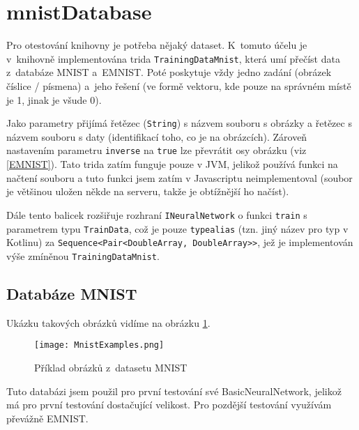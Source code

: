 \documentclass[12pt]{report}			%
\newcommand{\glsref}[1]{\glsdisp{#1}{\phantom{}}}
\begin{document}
			\section{mnistDatabase}
				Pro otestování knihovny je potřeba nějaký dataset. K~tomuto účelu je v~knihovně implementována \gls{trida} \verb!TrainingDataMnist!, která umí přečíst data z~databáze MNIST a~EMNIST. Poté poskytuje vždy jedno zadání (obrázek číslice / písmena) a~jeho řešení (ve formě vektoru, kde pouze na správném místě je 1, jinak je všude 0).
				
				Jako parametry přijímá řetězec (\verb!String!) s názvem souboru s obrázky a řetězec s názvem souboru s daty (identifikací toho, co je na obrázcích). Zároveň nastavením parametru \verb!inverse! na \glsref{true}\verb!true! lze převrátit osy obrázku (viz \ref{EMNIST}). Tato \gls{trida} zatím funguje pouze v \gls{JVM}, jelikož používá funkci na načtení souboru a tuto funkci jsem zatím v Javascriptu neimplementoval (soubor je většinou uložen někde na serveru, takže je obtížnější ho načíst).
				
				Dále tento \gls{balicek} rozšiřuje rozhraní \verb!INeuralNetwork! o funkci \verb!train! s parametrem \gls{typ}u \verb!TrainData!, což je pouze \verb!typealias! (tzn. jiný název pro \gls{typ} v \gls{Kotlin}u) za \glsref{DoubleArray}\glsref{Pair}\verb!Sequence<Pair<DoubleArray, DoubleArray>>!, jež je implementován výše zmíněnou  \verb!TrainingDataMnist!.
				
				\subsection{Databáze MNIST}
					 \parencite[přeloženo]{online:MNIST} Ukázku takových obrázků vidíme na obrázku \ref{fig:MNIST}.
					
					\begin{figure}
						\texttt{[image: MnistExamples.png]}
						\caption{Příklad obrázků z~datasetu MNIST \autocite{wiki:MNIST}}
						\label{fig:MNIST}
					\end{figure}
					
					Tuto databázi jsem použil pro první testování své BasicNeuralNetwork, jelikož má pro první testování dostačující velikost. Pro pozdější testování využívám převážně EMNIST.
\end{document}
